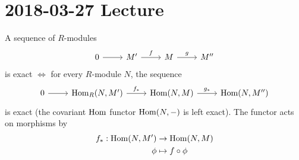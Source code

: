 \section{2018-03-27 Lecture}

\begin{prop}[1.10 continued]
	A sequence of $R$-modules
	\[
	\begin{tikzcd}
	0 \ar[r] & M' \ar[r, "f"] & M \ar[r, "g"] & M''
	\end{tikzcd}
	\]
	is exact $\iff$ for every $R$-module $N$, the sequence
	\[
	\begin{tikzcd}
	0 \ar[r] & \Hom_R(N,M') \ar[r, "f_*"] & \Hom(N,M) \ar[r, "g_*"] & \Hom(N,M'')
	\end{tikzcd}
	\]
	is exact (the covariant $\operatorname{Hom}$ functor $\operatorname{Hom}(N,-)$ is left exact).
	The functor acts on morphisms by
	\begin{align*}
	f_*: \operatorname{Hom}(N,M') &\to \operatorname{Hom}(N,M) \\
	\phi &\mapsto f\circ\phi
	\end{align*}
\end{prop}

